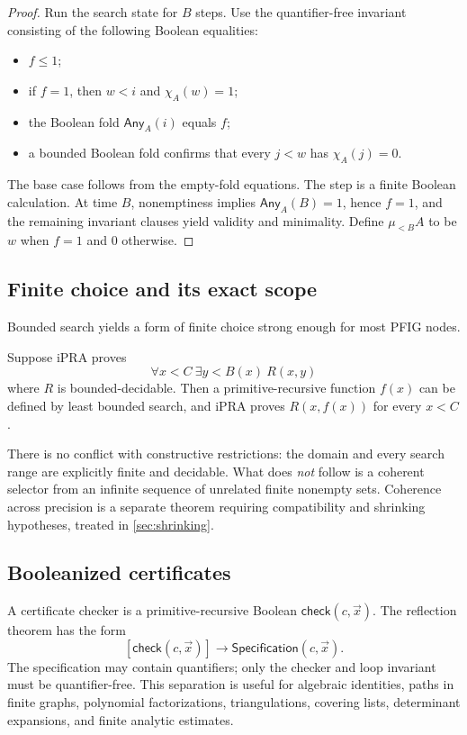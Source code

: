 \begin{proof}
Run the search state for \(B\) steps.  Use the quantifier-free invariant consisting of the following Boolean equalities:

\begin{itemize}
\item \(f\le 1\);
\item if \(f=1\), then \(w<i\) and \(\chi_A(w)=1\);
\item the Boolean fold \(\mathsf{Any}_A(i)\) equals \(f\);
\item a bounded Boolean fold confirms that every \(j<w\) has \(\chi_A(j)=0\).
\end{itemize}

The base case follows from the empty-fold equations.  The step is a finite Boolean calculation.  At time \(B\), nonemptiness implies \(\mathsf{Any}_A(B)=1\), hence \(f=1\), and the remaining invariant clauses yield validity and minimality.  Define \(\mu_{<B}A\) to be \(w\) when \(f=1\) and \(0\) otherwise.
\end{proof}

\subsection{Finite choice and its exact scope}

Bounded search yields a form of finite choice strong enough for most PFIG nodes.

\begin{corollary}
Suppose iPRA proves
\[
  \forall x<C\ \exists y<B(x)\ R(x,y)
\]
where \(R\) is bounded-decidable.  Then a primitive-recursive function \(f(x)\) can be defined by least bounded search, and iPRA proves \(R(x,f(x))\) for every \(x<C\).
\end{corollary}

There is no conflict with constructive restrictions: the domain and every search range are explicitly finite and decidable.  What does \emph{not} follow is a coherent selector from an infinite sequence of unrelated finite nonempty sets.  Coherence across precision is a separate theorem requiring compatibility and shrinking hypotheses, treated in \cref{sec:shrinking}.

\subsection{Booleanized certificates}

A certificate checker is a primitive-recursive Boolean \(\mathsf{check}(c,\vec{x})\).  The reflection theorem has the form
\[
 [\mathsf{check}(c,\vec{x})]\to \mathsf{Specification}(c,\vec{x}).
\]
The specification may contain quantifiers; only the checker and loop invariant must be quantifier-free.  This separation is useful for algebraic identities, paths in finite graphs, polynomial factorizations, triangulations, covering lists, determinant expansions, and finite analytic estimates.

